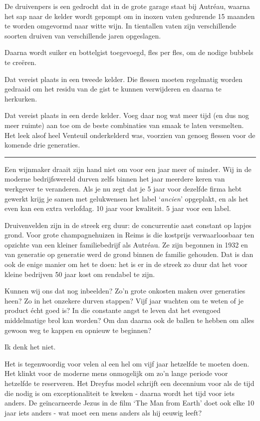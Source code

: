 \documentclass[
  11pt,
  dutch,
]{memoir}
\begin{document}
De druivenpers is een gedrocht dat in de grote garage staat bij Autréau,
waarna het sap naar de kelder wordt gepompt om in inoxen vaten gedurende
15 maanden te worden omgevormd naar witte wijn. In tientallen vaten zijn
verschillende soorten druiven van verschillende jaren opgeslagen.

Daarna wordt suiker en bottelgist toegevoegd, fles per fles, om de
nodige bubbels te creëren.

Dat vereist plaats in een tweede kelder. Die flessen moeten regelmatig
worden gedraaid om het residu van de gist te kunnen verwijderen en
daarna te herkurken.

Dat vereist plaats in een derde kelder. Voeg daar nog wat meer tijd (en
dus nog meer ruimte) aan toe om de beste combinaties van smaak te laten
versmelten. Het leek alsof heel Venteuil onderkelderd was, voorzien van
genoeg flessen voor de komende drie generaties.

\pfbreak

Een wijnmaker draait zijn hand niet om voor een jaar meer of minder. Wij
in de moderne bedrijfswereld durven zelfs binnen het jaar meerdere keren
van werkgever te veranderen. Als je nu zegt dat je 5 jaar voor dezelfde
firma hebt gewerkt krijg je samen met gelukwensen het label
`\emph{ancien}' opgeplakt, en als het even kan een extra verlofdag. 10
jaar voor kwaliteit. 5 jaar voor een label.

Druivenvelden zijn in de streek erg duur: de concurrentie aast constant
op lapjes grond. Voor grote champagnehuizen in Reims is die kostprijs
verwaarloosbaar ten opzichte van een kleiner familiebedrijf als Autréau.
Ze zijn begonnen in 1932 en van generatie op generatie werd de grond
binnen de familie gehouden. Dat is dan ook de enige manier om het te
doen: het is er in de streek zo duur dat het voor kleine bedrijven 50
jaar kost om rendabel te zijn.

Kunnen wij ons dat nog inbeelden? Zo'n grote onkosten maken over
generaties heen? Zo in het onzekere durven stappen? Vijf jaar wachten om
te weten of je product écht goed is? In die constante angst te leven dat
het evengoed middelmatige brol kan worden? Om dan daarna ook de ballen
te hebben om alles gewoon weg te kappen en opnieuw te beginnen?

Ik denk het niet.

Het is tegenwoordig voor velen al een hel om vijf jaar hetzelfde te
moeten doen. Het klinkt voor de moderne mens onmogelijk om zo'n lange
periode voor hetzelfde te reserveren. Het Dreyfus model schrijft een
decennium voor als de tijd die nodig is om exceptionaliteit te kweken -
daarna wordt het tijd voor iets anders. De geïncarneerde Jezus in de
film `The Man from Earth' doet ook elke 10 jaar iets anders - wat moet
een mens anders als hij eeuwig leeft?
\end{document}
